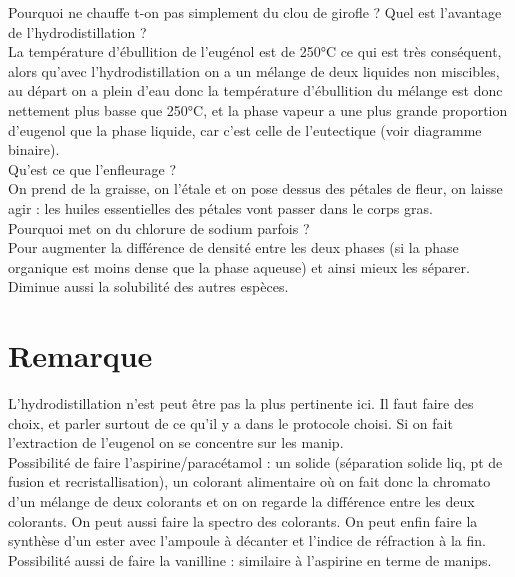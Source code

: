 \documentclass[12pt,prb,aps,epsf]{article}
\begin{document}
Pourquoi ne chauffe t-on pas simplement du clou de girofle ? Quel est l'avantage de l'hydrodistillation ?\\
La température d'ébullition de l'eugénol est de 250°C ce qui est très conséquent, alors qu'avec l'hydrodistillation on a un mélange de deux liquides non miscibles, au départ on a plein d'eau donc la température d'ébullition du mélange est donc nettement plus basse que 250°C, et la phase vapeur a une plus grande proportion d'eugenol que la phase liquide, car c'est celle de l'eutectique (voir diagramme binaire).\\

Qu'est ce que l'enfleurage ?\\
On prend de la graisse, on l'étale et on pose dessus des pétales de fleur, on laisse agir : les huiles essentielles des pétales vont passer dans le corps gras.\\

Pourquoi met on du chlorure de sodium parfois ?\\
Pour augmenter la différence de densité entre les deux phases (si la phase organique est moins dense que la phase aqueuse) et ainsi mieux les séparer. Diminue aussi la solubilité des autres espèces.

\section*{Remarque}
L'hydrodistillation n'est peut être pas la plus pertinente ici. Il faut faire des choix, et parler surtout de ce qu'il y a dans le protocole choisi. Si on fait l'extraction de l'eugenol on se concentre sur les manip.\\

Possibilité de faire l'aspirine/paracétamol : un solide (séparation solide liq, pt de fusion et recristallisation), un colorant alimentaire où on fait donc la chromato d'un mélange de deux colorants et on on regarde la différence entre les deux colorants. On peut aussi faire la spectro des colorants. On peut enfin faire la synthèse d'un ester avec l'ampoule à décanter et l'indice de réfraction à la fin.\\
Possibilité aussi de faire la vanilline : similaire à l'aspirine en terme de manips.
\end{document}
